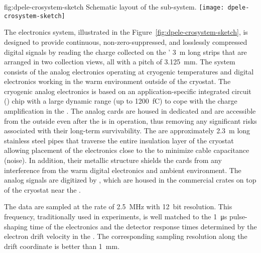 \begin{dunefigure}{fig:dpele-crosystem-sketch}
{Schematic layout of the   sub-system.}
\texttt{[image: dpele-crosystem-sketch]}
\end{dunefigure}

The  electronics system, illustrated in the Figure~\ref{fig:dpele-crosystem-sketch}, is designed to provide continuous, non-zero-suppressed, and losslessly compressed digital signals by reading the charge collected on the ' \SI{3}{m} long strips that are arranged in two collection views, all with a pitch of \SI{3.125}{mm}.%
The system consists of %
the  analog electronics operating at cryogenic temperatures and digital electronics working in the warm environment outside of the cryostat.  The cryogenic  analog electronics is based on an application-specific integrated circuit () chip with a large dynamic range (up to \SI{1200}{fC}) to cope with the charge amplification in the . The analog  cards are housed in dedicated  and are accessible from the outside even after the  is in operation, thus removing any significant risks associated with their long-term survivability. The  are approximately \SI{2.3}{m} long stainless steel pipes 
that traverse the entire insulation layer of the cryostat allowing placement of the  electronics close to the  to minimize cable capacitance (noise).  In addition, their metallic structure shields the  cards 
from any interference from the warm digital electronics and ambient environment. The analog signals are digitized by , which are housed in the commercial  crates on top of the cryostat near the . 

The  data are sampled at the rate of \SI{2.5}{MHz} with \SI{12}{bit} resolution.  
This frequency, traditionally used in \lartpc experiments, is well matched to the \SI{1}{\micro\second} pulse-shaping time of the  electronics and the detector response times determined by the electron drift velocity in the \lar. The corresponding sampling resolution along the drift coordinate is better than \SI{1}{\mm}. 

